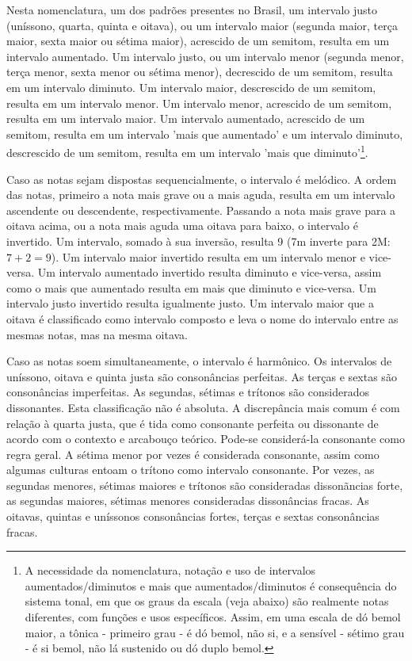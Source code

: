 Nesta nomenclatura, um dos padrões presentes no Brasil,
um intervalo justo (uníssono, quarta, quinta e oitava), ou um intervalo maior (segunda maior, terça maior, sexta maior ou sétima maior), acrescido de um semitom, resulta em um intervalo aumentado. Um intervalo justo, ou um intervalo menor (segunda menor, terça menor, sexta menor ou sétima menor), decrescido de um semitom, resulta em um intervalo diminuto. Um intervalo maior, descrescido de um semitom,
resulta em um intervalo menor. Um intervalo menor, acrescido de um semitom, resulta em um intervalo maior. Um intervalo aumentado, acrescido de um semitom, resulta em um intervalo 'mais que aumentado' e um intervalo diminuto, descrescido de um semitom, resulta em um intervalo 'mais que diminuto'\footnote{A
 necessidade da nomenclatura, notação e uso de intervalos aumentados/diminutos e mais que aumentados/diminutos é consequência do sistema tonal, em que os graus da escala (veja abaixo) são realmente notas diferentes, com funções e usos específicos. Assim, em uma escala de dó bemol maior, a tônica - primeiro grau - é dó bemol, não si, e a sensível - sétimo grau - é si bemol, não lá sustenido ou dó duplo bemol.}.\cite{Lacerda} 

Caso as notas sejam dispostas sequencialmente, o intervalo é melódico. A ordem das notas, primeiro a nota mais grave ou a mais aguda, resulta em um intervalo ascendente ou descendente, respectivamente. 
Passando a nota mais grave para a oitava acima, ou a nota mais aguda uma oitava para baixo, o intervalo é invertido. Um intervalo, somado à sua inversão, resulta 9 (7m inverte para 2M: $7+2=9$). Um intervalo maior invertido resulta em um intervalo menor e vice-versa. Um intervalo aumentado invertido resulta diminuto e vice-versa, assim como o mais que aumentado resulta em mais que diminuto e vice-versa. Um intervalo justo invertido resulta igualmente justo.
Um intervalo maior que a oitava é classificado como intervalo composto e leva o nome do intervalo entre as mesmas notas, mas na mesma oitava.

Caso as notas soem simultaneamente, o intervalo é harmônico. Os intervalos de uníssono, oitava e quinta justa são consonâncias perfeitas. As terças e sextas são consonâncias imperfeitas. As segundas, sétimas e trítonos são considerados dissonantes. Esta classificação não é absoluta. A discrepância mais comum é com relação à quarta justa, que é tida como consonante perfeita ou dissonante de acordo com o contexto e arcabouço teórico. Pode-se considerá-la consonante como regra geral. A sétima menor por vezes é considerada consonante, assim como algumas culturas entoam o trítono como intervalo consonante. Por vezes, as segundas menores, sétimas maiores e trítonos são consideradas dissonãncias forte, as segundas maiores, sétimas menores consideradas dissonâncias fracas. As oitavas, quintas e uníssonos consonâncias fortes, terças e sextas consonâncias fracas.\cite{Roederer,Wisnick}

